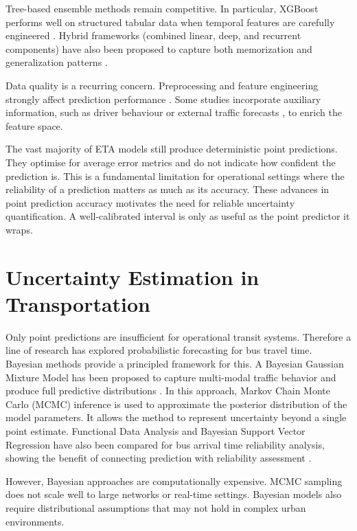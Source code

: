 \documentclass[12pt, a4paper, oneside]{report}
\begin{document}
Tree-based ensemble methods remain competitive. In particular, XGBoost performs well on structured tabular data when temporal features are carefully engineered \cite{Savithramma20241003}. Hybrid frameworks (combined linear, deep, and recurrent components) have also been proposed to capture both memorization and generalization patterns \cite{Wang2018858, Chu202376095}.

Data quality is a recurring concern. Preprocessing and feature engineering strongly affect prediction performance \cite{Reich20202843}. Some studies incorporate auxiliary information, such as driver behaviour \cite{Sun20224037} or external traffic forecasts \cite{Tran20202957}, to enrich the feature space.

The vast majority of ETA models still produce deterministic point predictions. They optimise for average error metrics and do not indicate how confident the prediction is. This is a fundamental limitation for operational settings where the reliability of a prediction matters as much as its accuracy. These advances in point prediction accuracy motivates the need for reliable uncertainty quantification. A well-calibrated interval is only as useful as the point predictor it wraps.

\section{Uncertainty Estimation in Transportation}

Only point predictions are insufficient for operational transit systems. Therefore a line of research has explored probabilistic forecasting for bus travel time. Bayesian methods provide a principled framework for this. A Bayesian Gaussian Mixture Model has been proposed to capture multi-modal traffic behavior and produce full predictive distributions \cite{Chen20231516}. In this approach, Markov Chain Monte Carlo (MCMC) inference is used to approximate the posterior distribution of the model parameters. It allows the method to represent uncertainty beyond a single point estimate. Functional Data Analysis and Bayesian Support Vector Regression have also been compared for bus arrival time reliability analysis, showing the benefit of connecting prediction with reliability assessment \cite{Huang2021}.

However, Bayesian approaches are computationally expensive. MCMC sampling does not scale well to large networks or real-time settings. Bayesian models also require distributional assumptions that may not hold in complex urban environments.
\end{document}
